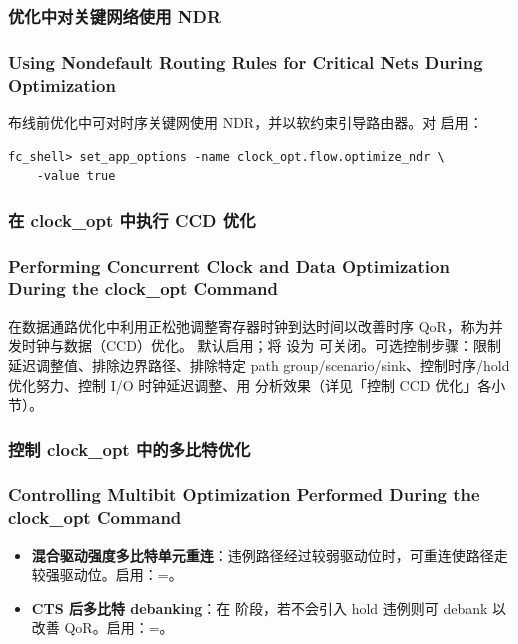 \subsubsection{优化中对关键网络使用 NDR}
\subsubsection*{Using Nondefault Routing Rules for Critical Nets During Optimization}

布线前优化中可对时序关键网使用 NDR，并以软约束引导路由器。对  启用：
\begin{lstlisting}
fc_shell> set_app_options -name clock_opt.flow.optimize_ndr \
    -value true
\end{lstlisting}

\subsubsection{在 clock\_opt 中执行 CCD 优化}
\subsubsection*{Performing Concurrent Clock and Data Optimization During the clock\_opt Command}

在数据通路优化中利用正松弛调整寄存器时钟到达时间以改善时序 QoR，称为并发时钟与数据（CCD）优化。 默认启用；将  设为  可关闭。可选控制步骤：限制延迟调整值、排除边界路径、排除特定 path group/scenario/sink、控制时序/hold 优化努力、控制 I/O 时钟延迟调整、用  分析效果（详见「控制 CCD 优化」各小节）。

\subsubsection{控制 clock\_opt 中的多比特优化}
\subsubsection*{Controlling Multibit Optimization Performed During the clock\_opt Command}

\begin{itemize}
  \item \textbf{混合驱动强度多比特单元重连}：违例路径经过较弱驱动位时，可重连使路径走较强驱动位。启用：=。
  \item \textbf{CTS 后多比特 debanking}：在 \cmd{final\_opto} 阶段，若不会引入 hold 违例则可 debank 以改善 QoR。启用：=。
\end{itemize}

